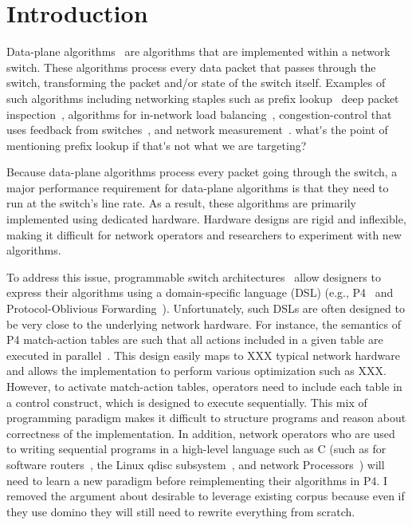 \section{Introduction}
\label{s:intro}

Data-plane algorithms~\cite{cestan} are algorithms that are implemented within
a network switch. These algorithms process every data packet that passes
through the switch, transforming the packet and/or state of the switch itself.
Examples of such algorithms including networking staples such as prefix
lookup~\cite{lookup} deep packet inspection~\cite{bro_ids}, algorithms for
in-network load balancing~\cite{conga, ecmp}, congestion-control that uses
feedback from switches~\cite{xcp, rcp, pdq, dctcp}, and network
measurement~\cite{minsketch, heavy_hitters}. 
\ac{what's the point of mentioning prefix lookup if that's not what we are targeting?}

Because data-plane algorithms process every packet going through the switch, a
major performance requirement for data-plane algorithms is that they need to run
at the switch's line rate. As a result, these algorithms are primarily
implemented using dedicated hardware. Hardware designs are rigid and
inflexible, making it difficult for network operators and researchers to
experiment with new algorithms.

To address this issue,
programmable switch architectures~\cite{flexpipe, xpliant, rmt} allow
designers to express their algorithms using a domain-specific language (DSL)
(e.g., P4~\cite{p4} and Protocol-Oblivious Forwarding~\cite{pof}).
Unfortunately, such DSLs are often designed to be very close 
to the underlying network hardware. For instance, the semantics of P4 match-action 
tables
are such that all actions included in a given table are executed in parallel~\cite{p4Spec}.
This design easily maps to XXX typical network hardware and allows the implementation
to perform various optimization such as XXX.
However, to activate match-action tables, operators need to include each table in a
control construct, which is designed to execute sequentially.
This mix of programming paradigm makes it difficult to structure programs
and reason about correctness of the implementation. In addition, network operators
who are used to writing sequential programs in a high-level language such as C
(such as for software routers~\cite{click},
the Linux qdisc subsystem~\cite{qdisc}, and network Processors~\cite{npu}) will need
to learn a new paradigm before reimplementing their algorithms in P4.
\ac{I removed the argument about desirable to leverage existing corpus because
even if they use domino they will still need to rewrite everything from scratch.}


